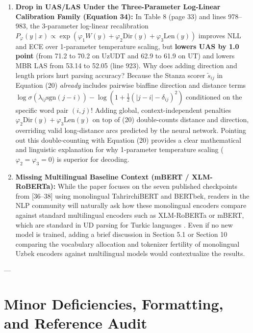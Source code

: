\documentclass[11pt,a4paper]{article}
\begin{document}
\begin{enumerate}[label=\textbf{Issue \arabic*:}, resume, wide, labelwidth=!, labelindent=0pt]
    \item \textbf{Drop in UAS/LAS Under the Three-Parameter Log-Linear Calibration Family (Equation 34):}
    In Table 8 (page 33) and lines 978--983, the 3-parameter log-linear recalibration $P_\varphi(y \mid x) \propto \exp(\varphi_1 W(y) + \varphi_2 \mathrm{Dir}(y) + \varphi_3 \mathrm{Len}(y))$ improves NLL and ECE over 1-parameter temperature scaling, but \textbf{lowers UAS by 1.0 point} (from 71.2 to 70.2 on UzUDT and 62.9 to 61.9 on UT) and lowers MBR LAS from 53.14 to 52.05 (line 923). Why does adding direction and length priors hurt parsing accuracy? Because the Stanza scorer $\tilde{s}_{ij}$ in Equation (20) \emph{already} includes pairwise biaffine direction and distance terms $\log \sigma(\lambda_{ij}\mathrm{sgn}(j-i)) - \log(1 + \frac{1}{2}(|j-i|-\delta_{ij})^2)$ conditioned on the specific word pair $(i,j)$! Adding global, context-independent penalties $\varphi_2 \mathrm{Dir}(y) + \varphi_3 \mathrm{Len}(y)$ on top of (20) double-counts distance and direction, overriding valid long-distance arcs predicted by the neural network. Pointing out this double-counting with Equation (20) provides a clear mathematical and linguistic explanation for why 1-parameter temperature scaling ($\varphi_2 = \varphi_3 = 0$) is superior for decoding.

    \item \textbf{Missing Multilingual Baseline Context (mBERT / XLM-RoBERTa):}
    While the paper focuses on the seven published checkpoints from [36--38] using monolingual TahrirchiBERT and BERTbek, readers in the NLP community will naturally ask how these monolingual encoders compare against standard multilingual encoders such as XLM-RoBERTa \cite{Conneau2020} or mBERT, which are standard in UD parsing for Turkic languages \cite{Kondratyuk2019}. Even if no new model is trained, adding a brief discussion in Section 5.1 or Section 10 comparing the vocabulary allocation and tokenizer fertility of monolingual Uzbek encoders against multilingual models would contextualize the results.
\end{enumerate}

---

\section{Minor Deficiencies, Formatting, and Reference Audit}
\end{document}
